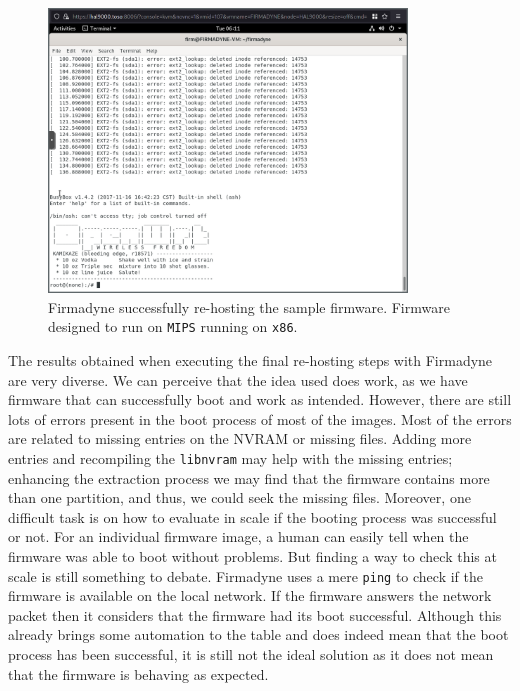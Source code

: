 \begin{figure}[H]
    \centering
    \includegraphics[width=0.85\textwidth]{figs/firmadyne-success.png}
    \caption{Firmadyne successfully re-hosting the sample firmware. Firmware designed to run on {\tt MIPS} running on {\tt x86}.}
    \label{fig:firmadyne-success}
\end{figure}

The results obtained when executing the final re-hosting steps with Firmadyne are very diverse. We can perceive that the idea used does work, as we have firmware that can successfully boot and work as intended. However, there are still lots of errors present in the boot process of most of the images. Most of the errors are related to missing entries on the NVRAM or missing files. Adding more entries and recompiling the {\tt libnvram} may help with the missing entries; enhancing the extraction process we may find that the firmware contains more than one partition, and thus, we could seek the missing files. Moreover, one difficult task is on how to evaluate in scale if the booting process was successful or not. For an individual firmware image, a human can easily tell when the firmware was able to boot without problems. But finding a way to check this at scale is still something to debate. Firmadyne uses a mere {\tt ping} to check if the firmware is available on the local network. If the firmware answers the network packet then it considers that the firmware had its boot successful. Although this already brings some automation to the table and does indeed mean that the boot process has been successful, it is still not the ideal solution as it does not mean that the firmware is behaving as expected.


